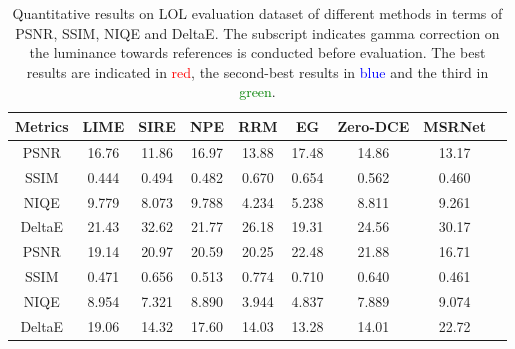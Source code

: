 \documentclass[10pt,twocolumn,letterpaper]{article}
\begin{document}
\begin{table*}[t]
  \caption{Quantitative results on LOL evaluation dataset of different methods in terms of PSNR, SSIM, NIQE and DeltaE. The subscript  indicates gamma correction on the luminance towards references is conducted before evaluation. The best results are indicated in \textcolor{red}{red}, the second-best results in \textcolor{blue}{blue} and the third in \textcolor{green}{green}.}
  \label{tab:lol_eval}
    \centering


\begin{tabular}{ccccccccc}
    \toprule[1pt]
      Metrics  & LIME \cite{guo2016lime} & SIRE \cite{fu2016weighted} & NPE \cite{wang2013naturalness}& RRM \cite{li2018structure}& EG \cite{jiang2021enlightengan}& Zero-DCE \cite{guo2020zero}& MSRNet \cite{shen2017msr}
      \\ \hline
  PSNR  & 16.76 & 11.86 & 16.97 & 13.88 & 17.48 & 14.86 & 13.17  \\
  SSIM & 0.444 & 0.494 & 0.482 & 0.670  & 0.654 & 0.562 & 0.460  \\ 
  NIQE & 9.779 & 8.073 & 9.788 & 4.234  & 5.238 & 8.811 & 9.261  \\
  DeltaE & 21.43 & 32.62 & 21.77 & 26.18  & 19.31 & 24.56 & 30.17  \\
  PSNR & 19.14 & 20.97 & 20.59 & 20.25 & 22.48 & 21.88 & 16.71\\
  SSIM & 0.471 & 0.656 & 0.513 & 0.774 & 0.710 & 0.640 & 0.461\\
  NIQE & 8.954 & 7.321 & 8.890 & 3.944  & 4.837 & 7.889 & 9.074  \\
  DeltaE & 19.06 & 14.32 & 17.60 & 14.03  & 13.28 & 14.01 & 22.72  \\\hline
   

\end{tabular}
\end{table*}
\end{document}
